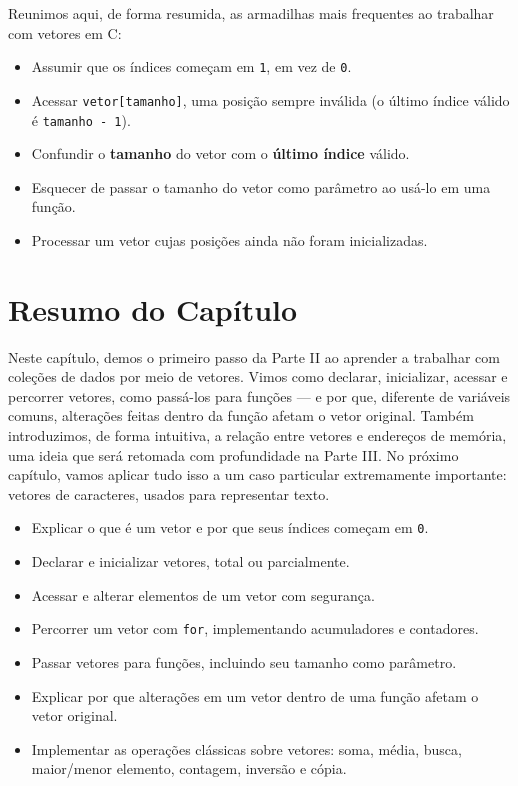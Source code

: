 Reunimos aqui, de forma resumida, as armadilhas mais frequentes ao trabalhar com vetores em C:

\begin{itemize}
    \item Assumir que os índices começam em \texttt{1}, em vez de \texttt{0}.
    \item Acessar \texttt{vetor[tamanho]}, uma posição sempre inválida (o último índice válido é \texttt{tamanho - 1}).
    \item Confundir o \textbf{tamanho} do vetor com o \textbf{último índice} válido.
    \item Esquecer de passar o tamanho do vetor como parâmetro ao usá-lo em uma função.
    \item Processar um vetor cujas posições ainda não foram inicializadas.
\end{itemize}

\section*{Resumo do Capítulo}
Neste capítulo, demos o primeiro passo da Parte II ao aprender a trabalhar com coleções de dados por meio de vetores. Vimos como declarar, inicializar, acessar e percorrer vetores, como passá-los para funções — e por que, diferente de variáveis comuns, alterações feitas dentro da função afetam o vetor original. Também introduzimos, de forma intuitiva, a relação entre vetores e endereços de memória, uma ideia que será retomada com profundidade na Parte III. No próximo capítulo, vamos aplicar tudo isso a um caso particular extremamente importante: vetores de caracteres, usados para representar texto.

\begin{objetivos}
\begin{itemize}
    \item Explicar o que é um vetor e por que seus índices começam em \texttt{0}.
    \item Declarar e inicializar vetores, total ou parcialmente.
    \item Acessar e alterar elementos de um vetor com segurança.
    \item Percorrer um vetor com \texttt{for}, implementando acumuladores e contadores.
    \item Passar vetores para funções, incluindo seu tamanho como parâmetro.
    \item Explicar por que alterações em um vetor dentro de uma função afetam o vetor original.
    \item Implementar as operações clássicas sobre vetores: soma, média, busca, maior/menor elemento, contagem, inversão e cópia.
\end{itemize}
\end{objetivos}

